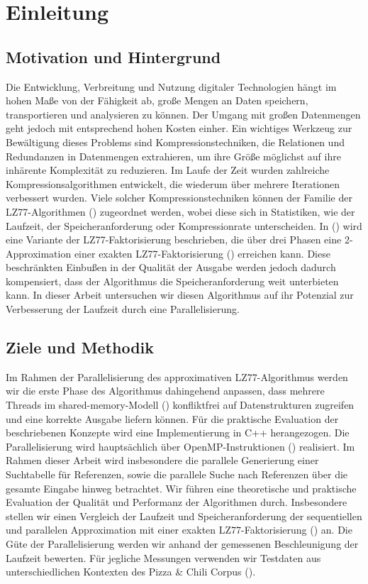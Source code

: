 \chapter{Einleitung}
\section{Motivation und Hintergrund}
Die Entwicklung, Verbreitung und Nutzung digitaler Technologien hängt im hohen Maße von der Fähigkeit ab, große Mengen an Daten speichern, transportieren und
analysieren zu können. Der Umgang mit großen Datenmengen geht jedoch mit entsprechend hohen Kosten einher. Ein wichtiges Werkzeug zur Bewältigung dieses Problems
sind Kompressionstechniken, die Relationen und Redundanzen in Datenmengen extrahieren, um ihre Größe möglichst auf ihre inhärente Komplexität zu reduzieren. 
Im Laufe der Zeit wurden zahlreiche Kompressionsalgorithmen entwickelt, die wiederum über mehrere Iterationen verbessert wurden. Viele solcher Kompressionstechniken
können der Familie der LZ77-Algorithmen (\cite{LemZiv}) zugeordnet werden, wobei diese sich in Statistiken, wie der Laufzeit, der Speicheranforderung oder Kompressionrate 
unterscheiden. In (\cite{ApproxLZ77}) wird eine Variante der LZ77-Faktorisierung beschrieben, die über drei Phasen eine 2-Approximation einer exakten LZ77-Faktorisierung
 (\cite{exactLemZiv}) erreichen kann. Diese beschränkten Einbußen in der Qualität der Ausgabe werden jedoch dadurch kompensiert, dass der Algorithmus die Speicheranforderung
weit unterbieten kann. In dieser Arbeit untersuchen wir diesen Algorithmus auf ihr Potenzial zur Verbesserung der Laufzeit durch eine Parallelisierung.

\section{Ziele und Methodik}
Im Rahmen der Parallelisierung des approximativen LZ77-Algorithmus werden wir die erste Phase des Algorithmus dahingehend anpassen, dass mehrere Threads im 
shared-memory-Modell (\cite{jaja}) konfliktfrei auf Datenstrukturen zugreifen und eine korrekte Ausgabe liefern können. Für die praktische Evaluation der
beschriebenen Konzepte wird eine Implementierung in C++ herangezogen. Die Parallelisierung wird hauptsächlich über OpenMP-Instruktionen (\cite{openmp}) realisiert.
Im Rahmen dieser Arbeit wird insbesondere die parallele Generierung einer Suchtabelle für Referenzen, sowie die parallele Suche nach Referenzen über die gesamte Eingabe
hinweg betrachtet. Wir führen eine theoretische und praktische Evaluation der Qualität und Performanz der Algorithmen durch. Insbesondere stellen wir einen Vergleich der
Laufzeit und Speicheranforderung der sequentiellen und parallelen Approximation mit einer exakten LZ77-Faktorisierung (\cite{exactLemZiv}) an. Die Güte der Parallelisierung
werden wir anhand der gemessenen Beschleunigung der Laufzeit bewerten. Für jegliche Messungen verwenden wir Testdaten aus unterschiedlichen Kontexten des 
Pizza \& Chili Corpus (\cite{corpus}).